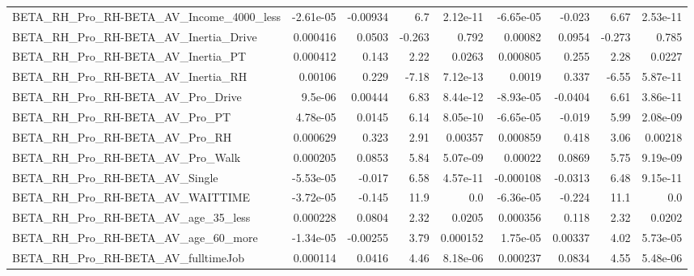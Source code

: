 \begin{tabular}{lrrrrrrrr}
BETA\_RH\_Pro\_RH-BETA\_AV\_Income\_4000\_less            &   -2.61e-05 &     -0.00934 &      6.7 & 2.12e-11 &  -6.65e-05 &      -0.023 &         6.67 &      2.53e-11 \\
BETA\_RH\_Pro\_RH-BETA\_AV\_Inertia\_Drive               &    0.000416 &       0.0503 &   -0.263 &    0.792 &    0.00082 &      0.0954 &       -0.273 &         0.785 \\
BETA\_RH\_Pro\_RH-BETA\_AV\_Inertia\_PT                  &    0.000412 &        0.143 &     2.22 &   0.0263 &   0.000805 &       0.255 &         2.28 &        0.0227 \\
BETA\_RH\_Pro\_RH-BETA\_AV\_Inertia\_RH                  &     0.00106 &        0.229 &    -7.18 & 7.12e-13 &     0.0019 &       0.337 &        -6.55 &      5.87e-11 \\
BETA\_RH\_Pro\_RH-BETA\_AV\_Pro\_Drive                   &     9.5e-06 &      0.00444 &     6.83 & 8.44e-12 &  -8.93e-05 &     -0.0404 &         6.61 &      3.86e-11 \\
BETA\_RH\_Pro\_RH-BETA\_AV\_Pro\_PT                      &    4.78e-05 &       0.0145 &     6.14 & 8.05e-10 &  -6.65e-05 &      -0.019 &         5.99 &      2.08e-09 \\
BETA\_RH\_Pro\_RH-BETA\_AV\_Pro\_RH                      &    0.000629 &        0.323 &     2.91 &  0.00357 &   0.000859 &       0.418 &         3.06 &       0.00218 \\
BETA\_RH\_Pro\_RH-BETA\_AV\_Pro\_Walk                    &    0.000205 &       0.0853 &     5.84 & 5.07e-09 &    0.00022 &      0.0869 &         5.75 &      9.19e-09 \\
BETA\_RH\_Pro\_RH-BETA\_AV\_Single                      &   -5.53e-05 &       -0.017 &     6.58 & 4.57e-11 &  -0.000108 &     -0.0313 &         6.48 &      9.15e-11 \\
BETA\_RH\_Pro\_RH-BETA\_AV\_WAITTIME                    &   -3.72e-05 &       -0.145 &     11.9 &      0.0 &  -6.36e-05 &      -0.224 &         11.1 &           0.0 \\
BETA\_RH\_Pro\_RH-BETA\_AV\_age\_35\_less                 &    0.000228 &       0.0804 &     2.32 &   0.0205 &   0.000356 &       0.118 &         2.32 &        0.0202 \\
BETA\_RH\_Pro\_RH-BETA\_AV\_age\_60\_more                 &   -1.34e-05 &     -0.00255 &     3.79 & 0.000152 &   1.75e-05 &     0.00337 &         4.02 &      5.73e-05 \\
BETA\_RH\_Pro\_RH-BETA\_AV\_fulltimeJob                 &    0.000114 &       0.0416 &     4.46 & 8.18e-06 &   0.000237 &      0.0834 &         4.55 &      5.48e-06 \\

\end{tabular}
